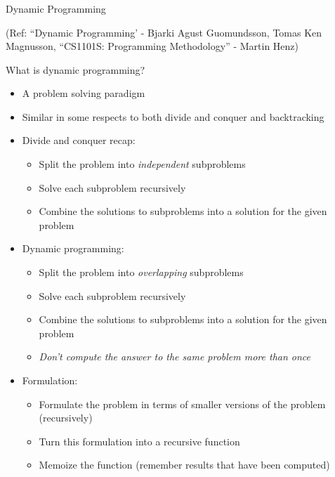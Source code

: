 \begin{frame}[fragile]\frametitle{}
\begin{center}
{\Large Dynamic Programming}
\end{center}

		{\tiny (Ref: ``Dynamic Programming' - Bjarki Agust Guomundsson, Tomas Ken Magnusson, ``CS1101S: Programming Methodology'' - Martin Henz)}

\end{frame}

\begin{frame}[fragile]{What is dynamic programming?}
    \begin{itemize}
        \item A problem solving paradigm
        \item Similar in some respects to both divide and conquer and backtracking
        \vspace{5pt}
        \item Divide and conquer recap:
            \begin{itemize}
                \item Split the problem into \textit{independent} subproblems
                \item Solve each subproblem recursively
                \item Combine the solutions to subproblems into a solution for the given problem
            \end{itemize}
        \vspace{5pt}
        \item Dynamic programming:
            \begin{itemize}
                \item Split the problem into \textit{overlapping} subproblems
                \item Solve each subproblem recursively
                \item Combine the solutions to subproblems into a solution for the given problem
                \item \textit{Don't compute the answer to the same problem more than once}
            \end{itemize}
				\item Formulation:
            \begin{itemize}
							\item Formulate the problem in terms of smaller versions of the problem (recursively)
							\item Turn this formulation into a recursive function
							\item Memoize the function (remember results that have been computed)						
            \end{itemize}
				
    \end{itemize}
		
\end{frame}

